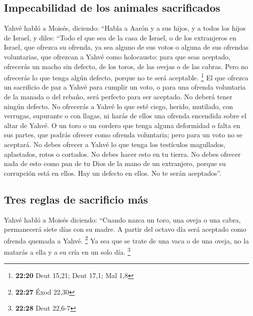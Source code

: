 \begin{paracol}{2}
\hypertarget{impecabilidad-de-los-animales-sacrificados}{%
\subsection{Impecabilidad de los animales
sacrificados}\label{impecabilidad-de-los-animales-sacrificados}}

 Yahvé habló a Moisés, diciendo:  ``Habla
a Aarón y a sus hijos, y a todos los hijos de Israel, y diles: ``Todo el
que sea de la casa de Israel, o de los extranjeros en Israel, que
ofrezca su ofrenda, ya sea alguno de sus votos o alguna de sus ofrendas
voluntarias, que ofrezcan a Yahvé como holocausto:  para
que seas aceptado, ofrecerás un macho sin defecto, de los toros, de las
ovejas o de las cabras.  Pero no ofrecerás lo que tenga
algún defecto, porque no te será aceptable. \footnote{\textbf{22:20}
  Deut 15,21; Deut 17,1; Mal 1,8}  El que ofrezca un
sacrificio de paz a Yahvé para cumplir un voto, o para una ofrenda
voluntaria de la manada o del rebaño, será perfecto para ser aceptado.
No deberá tener ningún defecto.  No ofrecerás a Yahvé lo
que esté ciego, herido, mutilado, con verrugas, supurante o con llagas,
ni harás de ellos una ofrenda encendida sobre el altar de Yahvé.
 O un toro o un cordero que tenga alguna deformidad o
falta en sus partes, que podrás ofrecer como ofrenda voluntaria; pero
para un voto no se aceptará.  No debes ofrecer a Yahvé lo
que tenga los testículos magullados, aplastados, rotos o cortados. No
debes hacer esto en tu tierra.  No debes ofrecer nada de
esto como pan de tu Dios de la mano de un extranjero, porque su
corrupción está en ellos. Hay un defecto en ellos. No te serán
aceptados''.

\hypertarget{tres-reglas-de-sacrificio-muxe1s}{%
\subsection{Tres reglas de sacrificio
más}\label{tres-reglas-de-sacrificio-muxe1s}}

 Yahvé habló a Moisés diciendo:  ``Cuando
nazca un toro, una oveja o una cabra, permanecerá siete días con su
madre. A partir del octavo día será aceptado como ofrenda quemada a
Yahvé. \footnote{\textbf{22:27} Éxod 22,30}  Ya sea que
se trate de una vaca o de una oveja, no la matarás a ella y a su cría en
un solo día. \footnote{\textbf{22:28} Deut 22,6-7}


\end{paracol}
